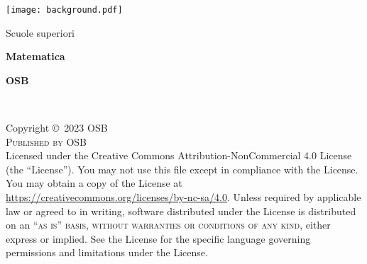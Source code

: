 \documentclass[
	11pt, %
	fleqn, %
	a4paper, %
]{LegrandOrangeBook}
\begin{document}

\titlepage %
	{\texttt{[image: background.pdf]}} %
	{ %
                \centering
		\vspace{16pt} %
		{\LARGE Scuole superiori\par} %
		\sffamily %
		{\Huge\bfseries Matematica\par} %
		\vspace{24pt} %
		{\huge\bfseries OSB\par} %
	}


\thispagestyle{empty} %

~\vfill %

\noindent Copyright \copyright\ 2023 OSB\\ %

\noindent \textsc{Published by OSB}\\ %


\noindent Licensed under the Creative Commons Attribution-NonCommercial 4.0 License (the ``License''). You may not use this file except in compliance with the License. You may obtain a copy of the License at \url{https://creativecommons.org/licenses/by-nc-sa/4.0}. Unless required by applicable law or agreed to in writing, software distributed under the License is distributed on an \textsc{``as is'' basis, without warranties or conditions of any kind}, either express or implied. See the License for the specific language governing permissions and limitations under the License.\\ %
\end{document}

